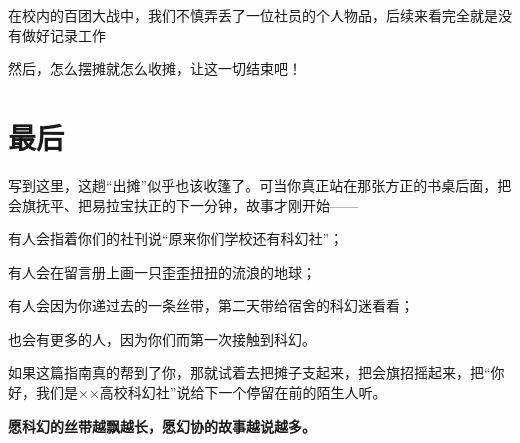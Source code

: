 在校内的百团大战中，我们不慎弄丢了一位社员的个人物品，后续来看完全就是没有做好记录工作

然后，怎么摆摊就怎么收摊，让这一切结束吧！

\section{最后}\label{ux6700ux540e}

写到这里，这趟``出摊''似乎也该收篷了。可当你真正站在那张方正的书桌后面，把会旗抚平、把易拉宝扶正的下一分钟，故事才刚开始------

有人会指着你们的社刊说``原来你们学校还有科幻社''；

有人会在留言册上画一只歪歪扭扭的流浪的地球；

有人会因为你递过去的一条丝带，第二天带给宿舍的科幻迷看看；

也会有更多的人，因为你们而第一次接触到科幻。

如果这篇指南真的帮到了你，那就试着去把摊子支起来，把会旗招摇起来，把``你好，我们是××高校科幻社''说给下一个停留在前的陌生人听。

\textbf{愿科幻的丝带越飘越长，愿幻协的故事越说越多。}